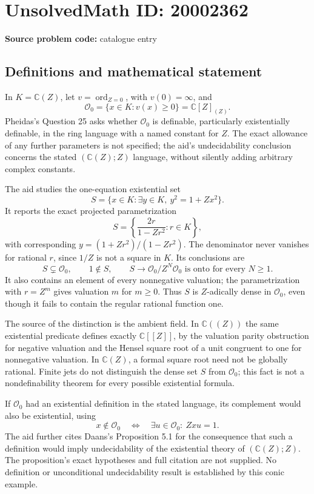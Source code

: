 \documentclass[11pt]{article}
\newcommand{\C}{\mathbb{C}}
\begin{document}
\section*{UnsolvedMath ID: 20002362}
\textbf{Source problem code:} catalogue entry
\subsection{Definitions and mathematical statement}
In \(K=\C(Z)\), let \(v=\operatorname{ord}_{Z=0}\), with \(v(0)=\infty\), and
\[
 \mathcal O_0=\{x\in K:v(x)\ge0\}=\C[Z]_{(Z)}.
\]
Pheidas's Question 25 asks whether \(\mathcal O_0\) is definable, particularly existentially definable, in the ring language with a named constant for \(Z\). The exact allowance of any further parameters is not specified; the aid's undecidability conclusion concerns the stated \((\C(Z);Z)\) language, without silently adding arbitrary complex constants.

The aid studies the one-equation existential set
\[
 S=\{x\in K:\exists y\in K,\ y^2=1+Zx^2\}.
\]
It reports the exact projected parametrization
\[
 S=\left\{\frac{2r}{1-Zr^2}:r\in K\right\},
\]
with corresponding \(y=(1+Zr^2)/(1-Zr^2)\). The denominator never vanishes for rational \(r\), since \(1/Z\) is not a square in \(K\). Its conclusions are
\[
 S\subsetneq\mathcal O_0,\qquad 1\notin S,
 \qquad
 S\longrightarrow\mathcal O_0/Z^N\mathcal O_0\text{ is onto for every }N\ge1.
\]
It also contains an element of every nonnegative valuation; the parametrization with \(r=Z^m\) gives valuation \(m\) for \(m\ge0\). Thus \(S\) is \(Z\)-adically dense in \(\mathcal O_0\), even though it fails to contain the regular rational function one.

The source of the distinction is the ambient field. In \(\C((Z))\) the same existential predicate defines exactly \(\C[[Z]]\), by the valuation parity obstruction for negative valuation and the Hensel square root of a unit congruent to one for nonnegative valuation. In \(\C(Z)\), a formal square root need not be globally rational. Finite jets do not distinguish the dense set \(S\) from \(\mathcal O_0\); this fact is not a nondefinability theorem for every possible existential formula.

If \(\mathcal O_0\) had an existential definition in the stated language, its complement would also be existential, using
\[
 x\notin\mathcal O_0\quad\Longleftrightarrow\quad
 \exists u\in\mathcal O_0:\ Zxu=1.
\]
The aid further cites Daans's Proposition 5.1 for the consequence that such a definition would imply undecidability of the existential theory of \((\C(Z);Z)\). The proposition's exact hypotheses and full citation are not supplied. No definition or unconditional undecidability result is established by this conic example.
\end{document}
